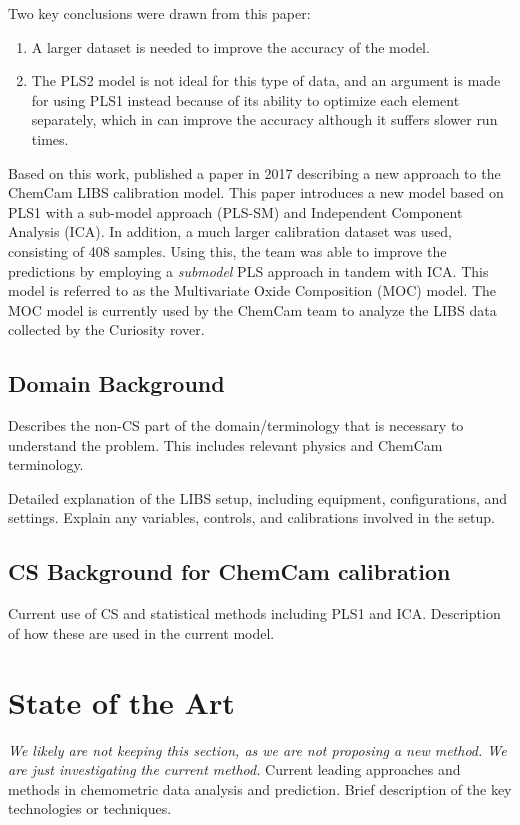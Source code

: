Two key conclusions were drawn from this paper:
\begin{enumerate}
    \item A larger dataset is needed to improve the accuracy of the model.
    \item The PLS2 model is not ideal for this type of data, and an argument is made for using PLS1 instead because of its ability to optimize each element separately, which in can improve the accuracy although it suffers slower run times.
\end{enumerate}

Based on this work, \citeauthor{cleggRecalibrationMarsScience2017} published a paper in 2017 describing a new approach to the ChemCam LIBS calibration model.
This paper introduces a new model based on PLS1 with a sub-model approach (PLS-SM) and Independent Component Analysis (ICA).
In addition, a much larger calibration dataset was used, consisting of 408 samples.
Using this, the team was able to improve the predictions by employing a \textit{submodel} PLS approach in tandem with ICA.
This model is referred to as the Multivariate Oxide Composition (MOC) model.
The MOC model is currently used by the ChemCam team to analyze the LIBS data collected by the Curiosity rover.

\subsection{Domain Background}
Describes the non-CS part of the domain/terminology that is necessary to understand the problem.
This includes relevant physics and ChemCam terminology.

Detailed explanation of the LIBS setup, including equipment, configurations, and settings.
Explain any variables, controls, and calibrations involved in the setup.

\subsection{CS Background for ChemCam calibration}
Current use of CS and statistical methods including PLS1 and ICA.
Description of how these are used in the current model.

\section{State of the Art}
\textit{We likely are not keeping this section, as we are not proposing a new method. We are just investigating the current method.}
Current leading approaches and methods in chemometric data analysis and prediction.
Brief description of the key technologies or techniques.

